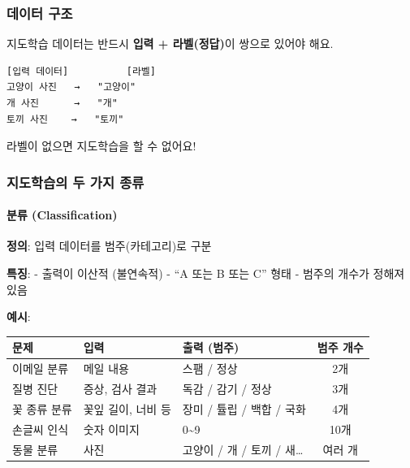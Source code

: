 \documentclass[a4paper, 11pt]{article}
\begin{document}
\hypertarget{uxb370uxc774uxd130-uxad6cuxc870}{%
\subsubsection{데이터 구조}\label{uxb370uxc774uxd130-uxad6cuxc870}}

지도학습 데이터는 반드시 \textbf{입력 + 라벨(정답)}이 쌍으로 있어야
해요.

\begin{verbatim}
[입력 데이터]          [라벨]
고양이 사진   →   "고양이"
개 사진      →   "개"
토끼 사진    →   "토끼"
\end{verbatim}

라벨이 없으면 지도학습을 할 수 없어요!

\hypertarget{uxc9c0uxb3c4uxd559uxc2b5uxc758-uxb450-uxac00uxc9c0-uxc885uxb958}{%
\subsubsection{지도학습의 두 가지
종류}\label{uxc9c0uxb3c4uxd559uxc2b5uxc758-uxb450-uxac00uxc9c0-uxc885uxb958}}

\hypertarget{uxbd84uxb958-classification}{%
\paragraph{ 분류 (Classification)}\label{uxbd84uxb958-classification}}

\textbf{정의}: 입력 데이터를 범주(카테고리)로 구분

\textbf{특징}: - 출력이 이산적 (불연속적) - ``A 또는 B 또는 C'' 형태 -
범주의 개수가 정해져 있음

\textbf{예시}:

\begin{longtable}[]{@{}lllc@{}}
\toprule\noalign{}
문제 & 입력 & 출력 (범주) & 범주 개수 \\
\midrule\noalign{}
\endhead
\bottomrule\noalign{}
\endlastfoot
이메일 분류 & 메일 내용 & 스팸 / 정상 & 2개 \\
질병 진단 & 증상, 검사 결과 & 독감 / 감기 / 정상 & 3개 \\
꽃 종류 분류 & 꽃잎 길이, 너비 등 & 장미 / 튤립 / 백합 / 국화 & 4개 \\
손글씨 인식 & 숫자 이미지 & 0\textasciitilde9 & 10개 \\
동물 분류 & 사진 & 고양이 / 개 / 토끼 / 새\ldots{} & 여러 개 \\
\end{longtable}
\end{document}
